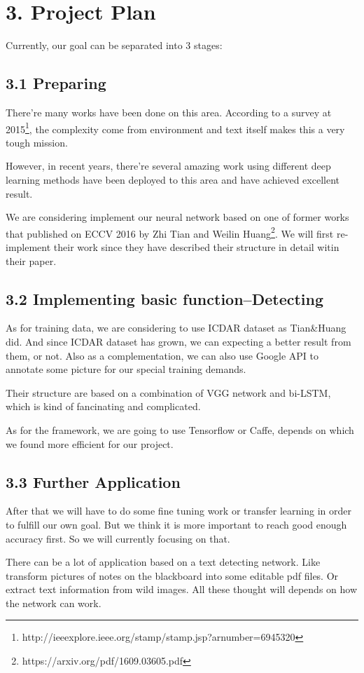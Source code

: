 \documentclass[]{article}
\begin{document}
\section{3. Project Plan}

Currently, our goal can be separated into 3 stages:

\subsection{3.1 Preparing}

There're many works have been done on this area. According to a survey at 2015\footnote{http://ieeexplore.ieee.org/stamp/stamp.jsp?arnumber=6945320}, the complexity come from environment and text itself makes this a very tough mission.

However, in recent years, there're several amazing work using different deep learning methods have been deployed to this area and have achieved excellent result.

We are considering implement our neural network based on one of former works that published on ECCV 2016 by Zhi Tian and Weilin Huang\footnote{https://arxiv.org/pdf/1609.03605.pdf}. We will first re-implement their work since they have described their structure in detail witin their paper. 


\subsection{3.2 Implementing basic function--Detecting}

As for training data, we are considering to use ICDAR dataset as Tian\&Huang did. And since ICDAR dataset has grown, we can expecting a better result from them, or not. Also as a complementation, we can also use Google API to annotate some picture for our special training demands.

Their structure are based on a combination of VGG network and bi-LSTM, which is kind of fancinating and complicated. 

As for the framework, we are going to use Tensorflow or Caffe, depends on which we found more efficient for our project.




\subsection{3.3 Further Application}

After that we will have to do some fine tuning work or transfer learning in order to fulfill our own goal. But we think it is more important to reach good enough accuracy first. So we will currently focusing on that.

There can be a lot of application based on a text detecting network. Like transform pictures of notes on the blackboard into some editable pdf files. Or extract text information from wild images. All these thought will depends on how the network can work.
\end{document}
